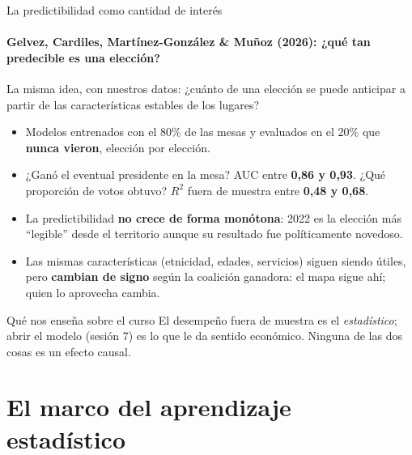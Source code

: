 \documentclass{beamer}
\newcommand{\1}{\mathbb{I}}
\begin{document}
\begin{frame}{La predictibilidad como cantidad de interés}
\framesubtitle{Gelvez, Cardiles, Martínez-González \& Muñoz (2026): ¿qué tan predecible es una elección?}
\small
La misma idea, con nuestros datos: ¿cuánto de una elección se puede anticipar a partir de las características estables de los lugares?
\pause
\begin{itemize}\itemsep4pt
  \item Modelos entrenados con el 80\% de las mesas y evaluados en el 20\% que \textbf{nunca vieron}, elección por elección.
  \item ¿Ganó el eventual presidente en la mesa? AUC entre \textbf{0,86 y 0,93}. ¿Qué proporción de votos obtuvo? $R^2$ fuera de muestra entre \textbf{0,48 y 0,68}. \pause
  \item La predictibilidad \textbf{no crece de forma monótona}: 2022 es la elección más ``legible'' desde el territorio aunque su resultado fue políticamente novedoso.
  \item Las mismas características (etnicidad, edades, servicios) siguen siendo útiles, pero \textbf{cambian de signo} según la coalición ganadora: el mapa sigue ahí; quien lo aprovecha cambia. \pause
\end{itemize}

\begin{block}{Qué nos enseña sobre el curso}
El desempeño fuera de muestra es el \emph{estadístico}; abrir el modelo (sesión 7) es lo que le da sentido económico. Ninguna de las dos cosas es un efecto causal.
\end{block}
\end{frame}


\section{El marco del aprendizaje estadístico}
\begin{frame}[noframenumbering]
\tableofcontents[currentsection]
\end{frame}
\end{document}
